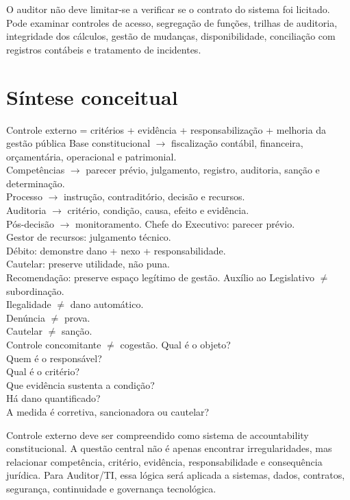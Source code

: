 \begin{exemplo}
O auditor não deve limitar-se a verificar se o contrato do sistema foi licitado. Pode examinar controles de acesso, segregação de funções, trilhas de auditoria, integridade dos cálculos, gestão de mudanças, disponibilidade, conciliação com registros contábeis e tratamento de incidentes.
\end{exemplo}

\section{Síntese conceitual}

{Controle externo = critérios + evidência + responsabilização + melhoria da gestão pública}
{Base constitucional $\rightarrow$ fiscalização contábil, financeira, orçamentária, operacional e patrimonial.\\Competências $\rightarrow$ parecer prévio, julgamento, registro, auditoria, sanção e determinação.\\Processo $\rightarrow$ instrução, contraditório, decisão e recursos.\\Auditoria $\rightarrow$ critério, condição, causa, efeito e evidência.\\Pós-decisão $\rightarrow$ monitoramento.}
{Chefe do Executivo: parecer prévio.\\Gestor de recursos: julgamento técnico.\\Débito: demonstre dano + nexo + responsabilidade.\\Cautelar: preserve utilidade, não puna.\\Recomendação: preserve espaço legítimo de gestão.}
{Auxílio ao Legislativo $\neq$ subordinação.\\Ilegalidade $\neq$ dano automático.\\Denúncia $\neq$ prova.\\Cautelar $\neq$ sanção.\\Controle concomitante $\neq$ cogestão.}
{Qual é o objeto?\\Quem é o responsável?\\Qual é o critério?\\Que evidência sustenta a condição?\\Há dano quantificado?\\A medida é corretiva, sancionadora ou cautelar?}

\begin{resumo}
Controle externo deve ser compreendido como sistema de accountability constitucional. A questão central não é apenas encontrar irregularidades, mas relacionar competência, critério, evidência, responsabilidade e consequência jurídica. Para Auditor/TI, essa lógica será aplicada a sistemas, dados, contratos, segurança, continuidade e governança tecnológica.
\end{resumo}
